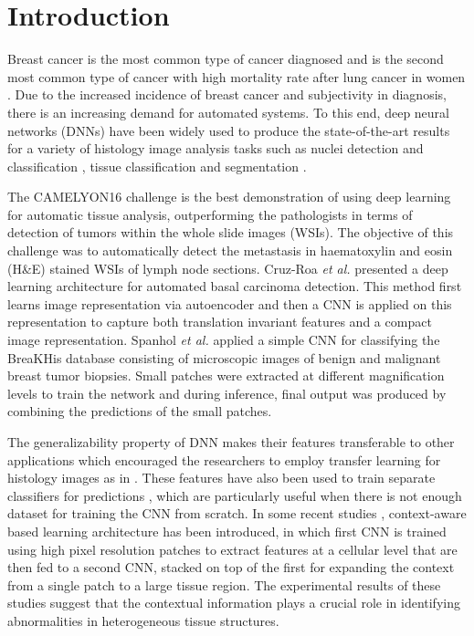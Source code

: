 \documentclass[runningheads,a4paper]{llncs}
\begin{document}
\section{Introduction}

Breast cancer is the most common type of cancer diagnosed and is the second most common type of cancer with high mortality rate after lung cancer in women \cite{siegel2016cancer}. Due to the increased incidence of breast cancer and subjectivity in diagnosis, there is an increasing demand for automated systems. To this end, deep neural networks (DNNs) have been widely used to produce the state-of-the-art results for a variety of histology image analysis tasks such as nuclei detection and classification \cite{sirinukunwattana2016locality}, tissue classification \cite{cruz2014automatic,wang2016deep} and segmentation \cite{chen2016dcan,bejnordi2017diagnostic}. 

The CAMELYON16 challenge \cite{bejnordi2017diagnostic} is the best demonstration of using deep learning for automatic tissue analysis, outperforming the pathologists in terms of detection of tumors within the whole slide images (WSIs). The objective of this challenge was to automatically detect the metastasis in haematoxylin and eosin (H\&E) stained WSIs of lymph node sections. Cruz-Roa \emph{et al.} \cite{cruz2014automatic} presented a deep learning architecture for automated basal carcinoma detection. This method first learns image representation via autoencoder and then a CNN is applied on this representation to capture both translation invariant features and a compact image representation. Spanhol \emph{et al.} \cite{spanhol2016breast} applied a simple CNN for classifying the BreaKHis database \cite{spanhol2016dataset} consisting of microscopic images of benign and malignant breast tumor biopsies. Small patches were extracted at different magnification levels to train the network and during inference, final output was produced by combining the predictions of the small patches.


The generalizability property of DNN makes their features transferable to other applications which encouraged the researchers to employ transfer learning for histology images as in \cite{chen2016dcan,bayramoglu2016transfer,han2017breast}. These features have also been used to train separate classifiers for predictions \cite{xu2017large,valkonen2017dual,xu2015deep,araujo2017classification}, which are particularly useful when there is not enough dataset for training the CNN from scratch. In some recent studies \cite{agarwalla2017representation,bejnordi2017context}, context-aware based learning architecture has been introduced, in which first CNN is trained using high pixel resolution patches to extract features at a cellular level that are then fed to a second CNN, stacked on top of the first for expanding the context from a single patch to a large tissue region. The experimental results of these studies suggest that the contextual information plays a crucial role in identifying abnormalities in heterogeneous tissue structures.
\end{document}
